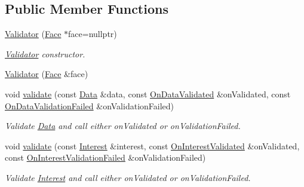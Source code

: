 \subsection*{Public Member Functions}
\begin{DoxyCompactItemize}
\item 
\hyperlink{classndn_1_1Validator_ab7db43406b6daa789545bcd2ce7c5e5a}{Validator} (\hyperlink{classndn_1_1Face}{Face} $\ast$face=nullptr)
\begin{DoxyCompactList}\small\item\em \hyperlink{classndn_1_1Validator}{Validator} constructor. \end{DoxyCompactList}\item 
\hyperlink{classndn_1_1Validator_abc284a4d3b8dd6ae7143a26e1a7d5231}{Validator} (\hyperlink{classndn_1_1Face}{Face} \&face)
\item 
void \hyperlink{classndn_1_1Validator_aee0e9b435fa39c3c4f6ac484122be4fd}{validate} (const \hyperlink{classndn_1_1Data}{Data} \&data, const \hyperlink{namespacendn_aeaa15e849fd25636f59ca61acb64e532}{On\+Data\+Validated} \&on\+Validated, const \hyperlink{namespacendn_ae3c60219d74ba747e368708d93782760}{On\+Data\+Validation\+Failed} \&on\+Validation\+Failed)
\begin{DoxyCompactList}\small\item\em Validate \hyperlink{classndn_1_1Data}{Data} and call either on\+Validated or on\+Validation\+Failed. \end{DoxyCompactList}\item 
void \hyperlink{classndn_1_1Validator_a74a0f001ecdf851276618608cd035990}{validate} (const \hyperlink{classndn_1_1Interest}{Interest} \&interest, const \hyperlink{namespacendn_a90fe4b4d97a7870d87f2fce8fdc88f95}{On\+Interest\+Validated} \&on\+Validated, const \hyperlink{namespacendn_a6cb4f04de7c1e8da06d8f5865b3d2877}{On\+Interest\+Validation\+Failed} \&on\+Validation\+Failed)
\begin{DoxyCompactList}\small\item\em Validate \hyperlink{classndn_1_1Interest}{Interest} and call either on\+Validated or on\+Validation\+Failed. \end{DoxyCompactList}\end{DoxyCompactItemize}
